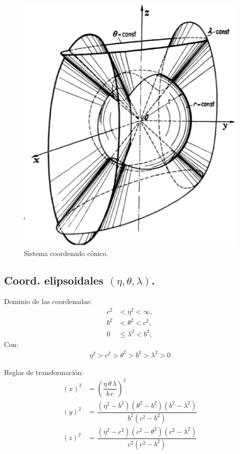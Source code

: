 \documentclass[12pt]{article}
\numberwithin{equation}{section}
\begin{document}
\begin{figure}[H]
    \centering
    \includegraphics[scale=0.5]{Imagenes/Sistema_Conico.eps}
    \caption{Sistema coordenado cónico.}
\end{figure}

\subsection{Coord. elipsoidales \texorpdfstring{$(\eta, \theta, \lambda)$}{(e, t, l)}.}

Dominio de las coordenadas:
\begin{align*}
c^{2} &< \eta^{2} < \infty, \\
b^{2} &< \theta^{2} < c^{2}, \\
0 &\leq \lambda^{2} < b^{2},
\end{align*}
Con:
\begin{align*}
\eta^{2} > c^{2} > \theta^{2} > b^{2} > \lambda^{2} > 0
\end{align*}

Reglas de transformación:
\begin{align*}
(x)^{2} &= \left( \dfrac{\eta \, \theta \, \lambda}{b \, c} \right)^{2} \\[0.5em]
(y)^{2} &= \dfrac{(\eta^{2} - b^{2})(\theta^{2} - b^{2})(b^{2} - \lambda^{2})}{b^{2}(c^{2} - b^{2})} \\[0.5em]
(z)^{2} &= \dfrac{(\eta^{2} - c^{2}) (c^{2} - \theta^{2})(c^{2} - \lambda^{2})}{c^{2} (c^{2} - b^{2})}
\end{align*}
\end{document}
